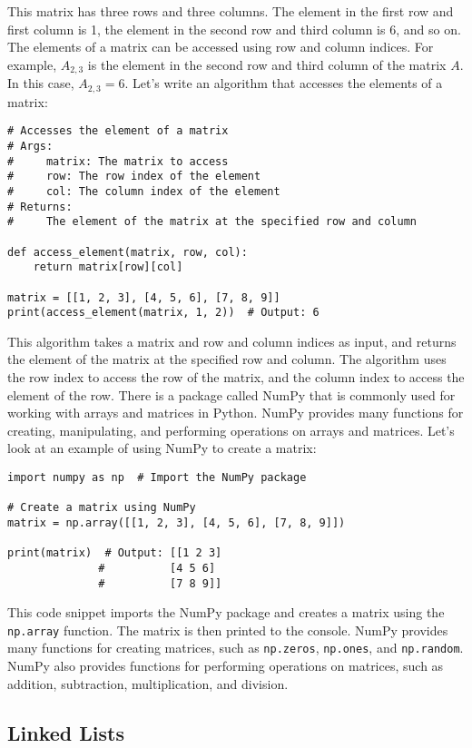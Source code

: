 This matrix has three rows and three columns. The element in the first row and first column is 1, the element in the second row and third column is 6, and so on. The elements of a matrix can be accessed using row and column indices. For example, $A_{2,3}$ is the element in the second row and third column of the matrix $A$. In this case, $A_{2,3} = 6$. Let's write an algorithm that accesses the elements of a matrix:

\begin{lstlisting}
# Accesses the element of a matrix
# Args:
#     matrix: The matrix to access
#     row: The row index of the element
#     col: The column index of the element
# Returns:
#     The element of the matrix at the specified row and column

def access_element(matrix, row, col):
    return matrix[row][col]

matrix = [[1, 2, 3], [4, 5, 6], [7, 8, 9]]
print(access_element(matrix, 1, 2))  # Output: 6
\end{lstlisting}

This algorithm takes a matrix and row and column indices as input, and returns the element of the matrix at the specified row and column. The algorithm uses the row index to access the row of the matrix, and the column index to access the element of the row. There is a package called NumPy that is commonly used for working with arrays and matrices in Python. NumPy provides many functions for creating, manipulating, and performing operations on arrays and matrices. Let's look at an example of using NumPy to create a matrix:

\begin{lstlisting}
import numpy as np  # Import the NumPy package

# Create a matrix using NumPy
matrix = np.array([[1, 2, 3], [4, 5, 6], [7, 8, 9]])

print(matrix)  # Output: [[1 2 3]
              #          [4 5 6]
              #          [7 8 9]]
\end{lstlisting}

This code snippet imports the NumPy package and creates a matrix using the \texttt{np.array} function. The matrix is then printed to the console. NumPy provides many functions for creating matrices, such as \texttt{np.zeros}, \texttt{np.ones}, and \texttt{np.random}. NumPy also provides functions for performing operations on matrices, such as addition, subtraction, multiplication, and division.

\subsection{Linked Lists}

